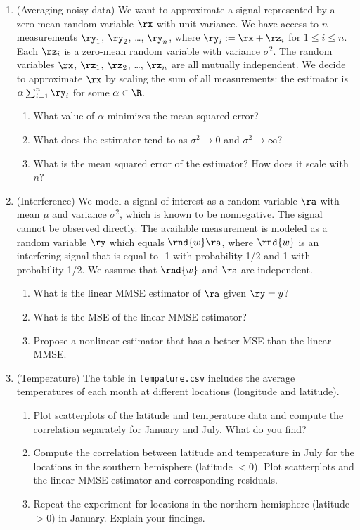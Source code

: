 \documentclass[12pt,twoside]{article}
\begin{document}
\begin{enumerate}
\item (Averaging noisy data) We want to approximate a signal represented by a zero-mean random variable $\rx$ with unit variance. We have access to $n$ measurements $\ry_1$, $\ry_2$, \ldots, $\ry_n$, where $\ry_i := \rx + \rz_i$ for $1\leq i \leq n$. Each $\rz_i$ is a zero-mean random variable with variance $\sigma^2$. The random variables $\rx$, $\rz_1$, $\rz_2$, \ldots, $\rz_n$ are all mutually independent. We decide to approximate $\rx$ by scaling the sum of all measurements: the estimator is $\alpha \sum_{i=1}^{n}\ry_i$ for some $\alpha \in \R$.
\begin{enumerate} 
\item What value of $\alpha$ minimizes the mean squared error? 
\item What does the estimator tend to as $\sigma^2 \rightarrow 0$ and $\sigma^2 \rightarrow \infty$? 
\item What is the mean squared error of the estimator? How does it scale with $n$?
\end{enumerate}

\item (Interference) We model a signal of interest as a random variable $\ra$ with mean $\mu$ and variance $\sigma^2$, which is known to be nonnegative. The signal cannot be observed directly. The available measurement is modeled as a random variable $\ry$ which equals $\rnd{w}\ra$, where $\rnd{w}$ is an interfering signal that is equal to -1 with probability 1/2 and 1 with probability 1/2. We assume that  $\rnd{w}$ and $\ra$ are independent.
\begin{enumerate} 
\item What is the linear MMSE estimator of $\ra$ given $\ry=y$? 
\item What is the MSE of the linear MMSE estimator? 
\item Propose a nonlinear estimator that has a better MSE than the linear MMSE.
\end{enumerate}

\item (Temperature) The table in \texttt{tempature.csv} includes the average temperatures of each month at different locations (longitude and latitude). 

\begin{enumerate}
	\item Plot scatterplots of the latitude and temperature data and compute the correlation separately for January and July. What do you find?
	\item Compute the correlation between latitude and temperature in July for the locations in the southern hemisphere (latitude $< 0$). Plot scatterplots and the linear MMSE estimator and corresponding residuals.
	\item Repeat the experiment for locations in the northern hemisphere (latitude $> 0$) in January. Explain your findings.
\end{enumerate}


\end{enumerate}
\end{document}
